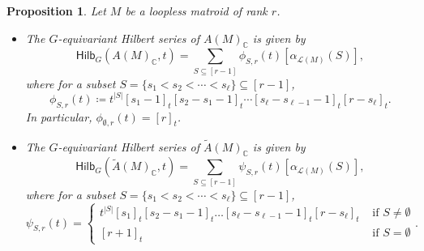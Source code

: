 \documentclass[reqno]{amsart}
\renewcommand{\L}{{\mathcal{L}}}
\newcommand{\Hilb}{{\mathsf{Hilb}}}
\newtheorem{prop}[thm]{Proposition}
\theoremstyle{definition}
\theoremstyle{remark}
\begin{document}
\begin{prop} \label{prop:HilbChow}
Let $M$ be a loopless matroid of rank $r$.
\begin{itemize} 
    \item[(i)] The $G$-equivariant Hilbert series of $A(M)_{\mathbb{C}}$ is given by
    \[
        \Hilb_G(A(M)_{\mathbb{C}},t)=\sum_{S\subseteq [r-1]}\phi_{S,r}(t)[\alpha_{\L(M)}(S)],
    \]
    where for a subset $S=\{s_1<s_2<\cdots<s_{\ell}\}\subseteq [r-1]$,
    \[
        \phi_{S,r}(t)\coloneqq t^{|S|}[s_1-1]_t[s_2-s_1-1]_t\cdots[s_{\ell}-s_{\ell-1}-1]_t[r-s_{\ell}]_t.
    \]
    In particular, $\phi_{\emptyset,r}(t)=[r]_t$.
    \item[(ii)] The $G$-equivariant Hilbert series of $\widetilde{A}(M)_{\mathbb{C}}$ is given by
    \[
    \Hilb_G(\widetilde{A}(M)_{\mathbb{C}},t)=\sum_{S\subseteq[r-1]}\psi_{S,r}(t)[\alpha_{\L(M)}(S)],
    \]
    where for a subset $S=\{s_1<s_2<\cdots<s_{\ell}\}\subseteq [r-1]$,
    \[
    \psi_{S,r}(t)=\begin{cases}
        t^{|S|}[s_1]_t[s_2-s_1-1]_t\ldots[s_{\ell}-s_{\ell-1}-1]_t[r-s_{\ell}]_t & \text{ if }S\neq \emptyset\\
        [r+1]_t & \text{ if } S=\emptyset
    \end{cases}.
    \]
\end{itemize}


\end{prop}
\end{document}
